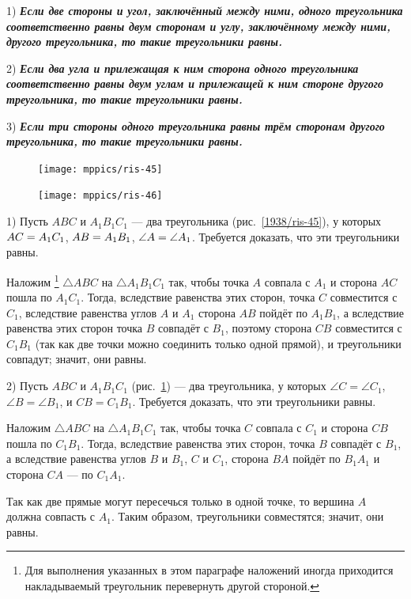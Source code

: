 1) \textbf{\emph{Если две стороны и угол, заключённый
между ними, одного треугольника соответственно равны
двум сторонам и углу, заключённому между ними, другого треугольника, то такие треугольники равны.}}

2) \textbf{\emph{Если два угла и прилежащая к ним сторона одного треугольника соответственно равны двум углам и прилежащей к ним стороне другого треугольника, то такие треугольники равны.}}

3) \textbf{\emph{Если три стороны одного треугольника равны трём сторонам другого треугольника, то такие треугольники равны.}}

\begin{figure}
\vskip-4mm
\centering
\texttt{[image: mppics/ris-45]}
\caption{}\label{1938/ris-45}
\bigskip
\texttt{[image: mppics/ris-46]}
\caption{}\label{1938/ris-46}
\end{figure}

1) Пусть $ABC$ и $A_1B_1C_1$ — два треугольника (рис.~\ref{1938/ris-45}), у которых
$AC\z=A_1C_1$, $AB \z= A_1B_1$, $\angle A \z= \angle A_1$.
Требуется доказать, что эти треугольники равны.

Наложим%
\footnote{Для выполнения указанных в этом параграфе наложений иногда приходится накладываемый треугольник перевернуть другой стороной.} 
$\triangle ABC$ на $\triangle A_1B_1C_1$ так, чтобы точка $A$ совпала с $A_1$ и сторона $AC$ пошла по $A_1C_1$.
Тогда, вследствие равенства этих сторон, точка $C$ совместится с $C_1$, вследствие равенства углов $A$ и $A_1$ сторона $AB$ пойдёт по $A_1B_1$, а вследствие равенства этих сторон точка $B$ совпадёт с $B_1$, поэтому сторона $CB$ совместится с $C_1B_1$ (так как две точки можно соединить только одной прямой), и треугольники совпадут;
значит, они равны.


2) Пусть $ABC$ и $A_1B_1C_1$ (рис.~\ref{1938/ris-46}) — два треугольника, у которых $\angle C= \angle C_1$,
$\angle B=\angle B_1$,
и
$CB = C_1B_1$.
Требуется доказать, что эти треугольники равны.

Наложим $\triangle ABC$ на $\triangle A_1B_1C_1$ так, чтобы точка $C$ совпала с $C_1$ и сторона $CB$ пошла по $C_1B_1$.
Тогда, вследствие равенства этих сторон, точка $B$ совпадёт с $B_1$, а вследствие равенства углов $B$ и $B_1$, $C$ и $C_1$, сторона $BA$ пойдёт по $B_1A_1$ и сторона $CA$ — по $C_1A_1$.

Так как две прямые могут пересечься только в одной точке, то вершина $A$ должна совпасть с $A_1$.
Таким образом, треугольники совместятся;
значит, они равны.


